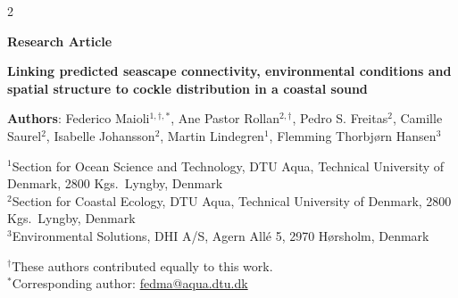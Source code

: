 \begin{spacing}{2}   %

\noindent

\noindent
\textbf{Research Article}   %

\noindent
\textbf{Linking predicted seascape connectivity, environmental conditions and spatial structure to cockle distribution in a coastal sound}

\noindent
\textbf{Authors}: Federico Maioli$^{1,\dagger,*}$, Ane Pastor Rollan$^{2,\dagger}$, Pedro S. Freitas$^{2}$, Camille Saurel$^{2}$, Isabelle Johansson$^{2}$, Martin Lindegren$^{1}$, Flemming Thorbjørn Hansen$^{3}$

\vspace{0.5em}
\noindent
$^{1}$Section for Ocean Science and Technology, DTU Aqua, Technical University of Denmark, 2800 Kgs.\ Lyngby, Denmark\\
$^{2}$Section for Coastal Ecology, DTU Aqua, Technical University of Denmark, 2800 Kgs.\ Lyngby, Denmark\\
$^{3}$Environmental Solutions, DHI A/S, Agern Allé 5, 2970 Hørsholm, Denmark

\vspace{0.5em}
\noindent
$^{\dagger}$These authors contributed equally to this work.\\
$^{*}$Corresponding author: \href{mailto:fedma@aqua.dtu.dk}{fedma@aqua.dtu.dk}

\noindent 




\linenumbers
\setcounter{secnumdepth}{3}   %
\clearpage


\end{spacing}

